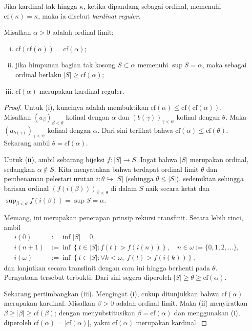\begin{definition}\label{def:regular-cardinal}
	Jika kardinal tak hingga $\kappa$, ketika dipandang sebagai ordinal, memenuhi $\mathrm{cf}(\kappa) = \kappa$, maka ia disebut \emph{kardinal reguler}.
\end{definition}

\begin{proposition}\label{prop:cf-generalities}
	Misalkan $\alpha > 0$ adalah ordinal limit:
	\begin{enumerate}[(i)]
		\item $\mathrm{cf}(\mathrm{cf}(\alpha)) = \mathrm{cf}(\alpha)$;
		\item jika himpunan bagian tak kosong $S \subset \alpha$ memenuhi $\sup S = \alpha$, maka sebagai ordinal berlaku $|S| \geq \mathrm{cf}(\alpha)$;
		\item $\mathrm{cf}(\alpha)$ merupakan kardinal reguler.
	\end{enumerate}
\end{proposition}
\begin{proof}
	Untuk (i), kuncinya adalah membuktikan $\mathrm{cf}(\alpha) \leq \mathrm{cf}(\mathrm{cf}(\alpha))$. Misalkan $(a_\beta)_{\beta < \theta}$ kofinal dengan $\alpha$ dan $(b(\gamma))_{\gamma < \psi}$ kofinal dengan $\theta$. Maka $\left(a_{b(\gamma)}\right)_{\gamma < \psi}$ kofinal dengan $\alpha$. Dari sini terlihat bahwa $\mathrm{cf}(\alpha) \leq \mathrm{cf}(\theta)$. Sekarang ambil $\theta = \mathrm{cf}(\alpha)$.
	
	Untuk (ii), ambil sebarang bijeksi $f: |S| \to S$. Ingat bahwa $|S|$ merupakan ordinal, sedangkan $\alpha \notin S$. Kita menyatakan bahwa terdapat ordinal limit $\theta$ dan pembenaman pelestari urutan $i: \theta \hookrightarrow |S|$ (sehingga $\theta \leq |S|$), sedemikian sehingga barisan ordinal $\left( f(i(\beta)) \right)_{\beta < \theta}$ di dalam $S$ naik secara ketat dan $\sup_{\beta < \theta} f(i(\beta)) = \sup S = \alpha$.
	
	Memang, ini merupakan penerapan prinsip rekursi transfinit. Secara lebih rinci, ambil
	\begin{align*}
		i(0) & := \inf |S| = 0, \\
		i(n+1) & := \inf\left\{ t \in |S|: f(t) > f(i(n)) \right\}, \quad n \in \omega := \{0, 1, 2, \ldots\}, \\
		i(\omega) & := \inf\left\{ t \in |S|: \forall k < \omega, \; f(t) > f(i(k)) \right\},
	\end{align*}
	dan lanjutkan secara transfinit dengan cara ini hingga berhenti pada $\theta$. Pernyataan tersebut terbukti. Dari sini segera diperoleh $|S| \geq \theta \geq \mathrm{cf}(\alpha)$.
	
	Sekarang pertimbangkan (iii). Mengingat (i), cukup ditunjukkan bahwa $\mathrm{cf}(\alpha)$ merupakan kardinal. Misalkan $\beta > 0$ adalah ordinal limit. Maka (ii) menyiratkan $\beta \geq |\beta| \geq \mathrm{cf}(\beta)$; dengan menyubstitusikan $\beta = \mathrm{cf}(\alpha)$ dan menggunakan (i), diperoleh $\mathrm{cf}(\alpha) = |\mathrm{cf}(\alpha)|$, yakni $\mathrm{cf}(\alpha)$ merupakan kardinal.
\end{proof}

